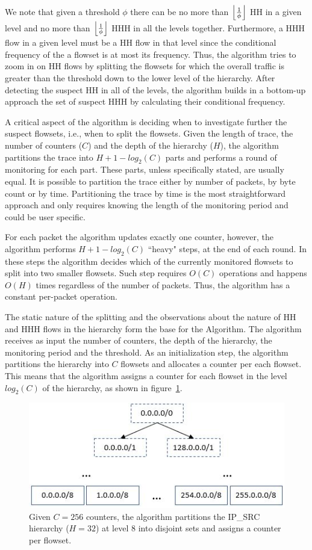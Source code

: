 We note that given a threshold $\phi$ there can be no more than $\left\lfloor \frac{1}{\phi} \right\rfloor$ HH in a given level and no more than $\left\lfloor \frac{1}{\phi} \right\rfloor$ HHH in all the levels together.
Furthermore, a HHH flow in a given level must be a HH flow in that level since the conditional frequency of the a flowset is at most its frequency.
Thus, the algorithm tries to zoom in on HH flows by splitting the flowsets for which the overall traffic is greater than the threshold down to the lower level of the hierarchy. After detecting the suspect HH in all of the levels, the algorithm builds in a bottom-up approach the set of suspect HHH by calculating their conditional frequency.

A critical aspect of the algorithm is deciding when to investigate further the suspect flowsets, i.e., when to split the flowsets. Given the length of trace, the number of counters ($C$) and the depth of the hierarchy ($H$), the algorithm partitions the trace into $H+1-log_2(C)$ parts and performs a round of monitoring for each part. These parts, unless specifically stated, are usually equal. It is possible to partition the trace either by number of packets, by byte count or by time. Partitioning the trace by time is the most straightforward approach and only requires knowing the length of the monitoring period and could be user specific.

For each packet the algorithm updates exactly one counter, however, the algorithm performs $H+1-log_2(C)$ ``heavy" steps, at the end of each round. In these steps the algorithm decides which of the currently monitored flowsets to split into two smaller flowsets. Such step requires $O(C)$ operations and happens $O(H)$ times regardless of the number of packets. Thus, the algorithm has a constant per-packet operation.

The static nature of the splitting and the observations about the nature of HH and HHH flows in the hierarchy form the base for the \simpleAlgo Algorithm. The algorithm receives as input the number of counters, the depth of the hierarchy, the monitoring period and the threshold. As an initialization step, the algorithm partitions the hierarchy into $C$ flowsets and allocates a counter per each flowset. This means that the algorithm assigns a counter for each flowset in the level $log_2(C)$ of the hierarchy, as shown in figure~\ref{fig:init}.

\begin{figure}
	\centering
    \includegraphics[width=\linewidth]{HHH/jpg_figures/init.JPG}
\caption{Given $C=256$ counters, the algorithm partitions the IP\_SRC hierarchy ($H=32$) at level $8$ into disjoint sets and assigns a counter per flowset.}
\label{fig:init}
\end{figure}

